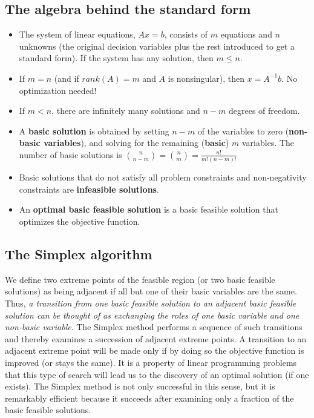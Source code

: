 \subsection{The algebra behind the standard form}

  \begin{itemize}
 \item The system of linear equations, $Ax = b$, consists of $m$ equations and $n$
unknowns (the original decision variables plus the rest introduced to get a standard form). If the system has any solution, then $m \leq n$.
\item If $m = n$ (and if $rank (A) = m$ and $A$ is nonsingular), then 
$x = A^{-1}b$. No optimization needed!
\item If $m < n$, there are infinitely many solutions and $n -m$ degrees of freedom. 
\item A {\bf basic solution} is obtained by setting $n - m$ of the variables to zero ({\bf non-basic variables}), and solving for the remaining ({\bf basic}) $m$ variables. The number of basic solutions is $\binom{n}{n-m}=\binom{n}{m}=\frac{n!}{m!(n-m)!}$
\item Basic solutions that do not satisfy all problem constraints and non-negativity constraints are {\bf infeasible solutions}.
\item An {\bf optimal basic feasible solution} is a
basic feasible solution that optimizes the objective function. 
\end{itemize}

\subsection{The Simplex algorithm}

We define
two extreme points of the feasible region (or two basic feasible solutions) as being adjacent if all but one of their basic variables are the same. Thus, {\em a transition from one basic
feasible solution to an adjacent basic feasible solution can be thought of as exchanging
the roles of one basic variable and one non-basic variable}. The Simplex method performs a sequence of such transitions and thereby examines a succession of adjacent
extreme points. A transition to an adjacent extreme point will be made only if by doing
so the objective function is improved (or stays the same). It is a property of linear programming problems that this type of search will lead us to the discovery of an optimal
solution (if one exists). The Simplex method is not only successful in this sense, but it
is remarkably efficient because it succeeds after examining only a fraction of the basic
feasible solutions.\cite{carter_operations_2019}

